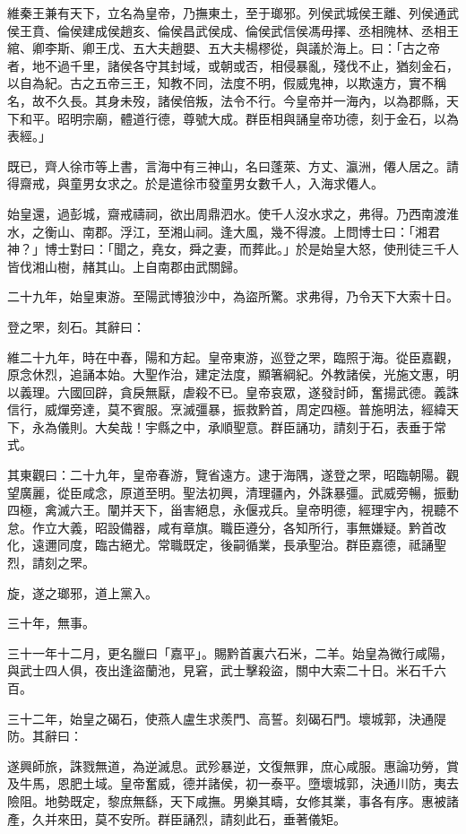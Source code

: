 \begin{pinyinscope}
維秦王兼有天下，立名為皇帝，乃撫東土，至于瑯邪。列侯武城侯王離、列侯通武侯王賁、倫侯建成侯趙亥、倫侯昌武侯成、倫侯武信侯馮毋擇、丞相隗林、丞相王綰、卿李斯、卿王戊、五大夫趙嬰、五大夫楊樛從，與議於海上。曰：「古之帝者，地不過千里，諸侯各守其封域，或朝或否，相侵暴亂，殘伐不止，猶刻金石，以自為紀。古之五帝三王，知教不同，法度不明，假威鬼神，以欺遠方，實不稱名，故不久長。其身未歿，諸侯倍叛，法令不行。今皇帝并一海內，以為郡縣，天下和平。昭明宗廟，體道行德，尊號大成。群臣相與誦皇帝功德，刻于金石，以為表經。」

既已，齊人徐市等上書，言海中有三神山，名曰蓬萊、方丈、瀛洲，僊人居之。請得齋戒，與童男女求之。於是遣徐市發童男女數千人，入海求僊人。

始皇還，過彭城，齋戒禱祠，欲出周鼎泗水。使千人沒水求之，弗得。乃西南渡淮水，之衡山、南郡。浮江，至湘山祠。逢大風，幾不得渡。上問博士曰：「湘君神？」博士對曰：「聞之，堯女，舜之妻，而葬此。」於是始皇大怒，使刑徒三千人皆伐湘山樹，赭其山。上自南郡由武關歸。

二十九年，始皇東游。至陽武博狼沙中，為盜所驚。求弗得，乃令天下大索十日。

登之罘，刻石。其辭曰：

維二十九年，時在中春，陽和方起。皇帝東游，巡登之罘，臨照于海。從臣嘉觀，原念休烈，追誦本始。大聖作治，建定法度，顯箸綱紀。外教諸侯，光施文惠，明以義理。六國回辟，貪戾無厭，虐殺不已。皇帝哀眾，遂發討師，奮揚武德。義誅信行，威燀旁達，莫不賓服。烹滅彊暴，振救黔首，周定四極。普施明法，經緯天下，永為儀則。大矣哉！宇縣之中，承順聖意。群臣誦功，請刻于石，表垂于常式。

其東觀曰：二十九年，皇帝春游，覽省遠方。逮于海隅，遂登之罘，昭臨朝陽。觀望廣麗，從臣咸念，原道至明。聖法初興，清理疆內，外誅暴彊。武威旁暢，振動四極，禽滅六王。闡并天下，甾害絕息，永偃戎兵。皇帝明德，經理宇內，視聽不怠。作立大義，昭設備器，咸有章旗。職臣遵分，各知所行，事無嫌疑。黔首改化，遠邇同度，臨古絕尤。常職既定，後嗣循業，長承聖治。群臣嘉德，祗誦聖烈，請刻之罘。

旋，遂之瑯邪，道上黨入。

三十年，無事。

三十一年十二月，更名臘曰「嘉平」。賜黔首裏六石米，二羊。始皇為微行咸陽，與武士四人俱，夜出逢盜蘭池，見窘，武士擊殺盜，關中大索二十日。米石千六百。

三十二年，始皇之碣石，使燕人盧生求羨門、高誓。刻碣石門。壞城郭，決通隄防。其辭曰：

遂興師旅，誅戮無道，為逆滅息。武殄暴逆，文復無罪，庶心咸服。惠論功勞，賞及牛馬，恩肥土域。皇帝奮威，德并諸侯，初一泰平。墮壞城郭，決通川防，夷去險阻。地勢既定，黎庶無繇，天下咸撫。男樂其疇，女修其業，事各有序。惠被諸產，久并來田，莫不安所。群臣誦烈，請刻此石，垂著儀矩。


\end{pinyinscope}
